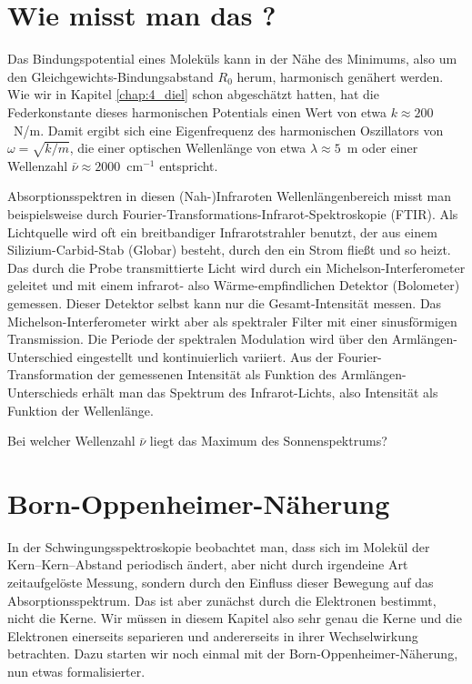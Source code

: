 \section{Wie misst man das ?}

Das Bindungspotential eines Moleküls kann in der Nähe des Minimums, also um den Gleichgewichts-Bindungsabstand $R_0$ herum, harmonisch genähert werden.
Wie wir in Kapitel \ref{chap:4_diel} schon abgeschätzt hatten, hat die Federkonstante dieses harmonischen Potentials einen Wert von etwa $k \approx 200$~N/m. Damit ergibt sich eine Eigenfrequenz des harmonischen Oszillators von $\omega = \sqrt{k / m}$, die einer optischen Wellenlänge von etwa $\lambda \approx 5$~\textmu m oder einer Wellenzahl $\bar{\nu} \approx 2000$~cm$^{-1}$ entspricht. 

Absorptionsspektren in diesen (Nah-)Infraroten Wellenlängenbereich misst man beispielsweise durch Fourier-Transformations-Infrarot-Spektroskopie (FTIR). Als Lichtquelle wird oft ein breitbandiger Infrarotstrahler benutzt, der aus einem Silizium-Carbid-Stab (Globar) besteht, durch den ein Strom fließt und so heizt. Das durch die Probe transmittierte Licht wird durch ein Michelson-Interferometer geleitet und mit einem infrarot-  also Wärme-empfindlichen Detektor (Bolometer) gemessen. Dieser Detektor selbst kann nur die Gesamt-Intensität messen. Das Michelson-Interferometer wirkt aber als spektraler Filter mit einer sinusförmigen Transmission. Die Periode der spektralen Modulation wird über den Armlängen-Unterschied eingestellt und kontinuierlich variiert. Aus der Fourier-Transformation der gemessenen Intensität als Funktion des Armlängen-Unterschieds erhält man das Spektrum des Infrarot-Lichts, also Intensität als Funktion der Wellenlänge.


\begin{questions} 
\item Bei welcher Wellenzahl $\bar{\nu}$ liegt das Maximum des Sonnenspektrums?
\end{questions}

\section{Born-Oppenheimer-Näherung}

In der Schwingungsspektroskopie beobachtet man, dass sich im Molekül der Kern--Kern--Abstand  periodisch ändert, aber nicht durch irgendeine Art zeitaufgelöste Messung, sondern durch den Einfluss dieser Bewegung auf das Absorptionsspektrum. Das ist aber zunächst durch die Elektronen bestimmt, nicht die Kerne. Wir müssen in diesem Kapitel also sehr genau die Kerne und die Elektronen einerseits separieren und andererseits in ihrer Wechselwirkung betrachten. Dazu starten wir noch einmal mit der Born-Oppenheimer-Näherung, nun etwas formalisierter.

